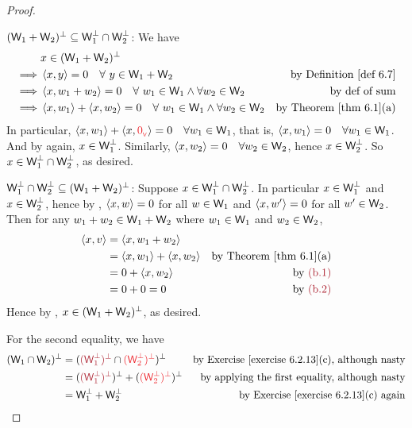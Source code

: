 \begin{proof} \ 

\((\textsf{W}_1 + \textsf{W}_2)^{\perp} \subseteq \textsf{W}_1^{\perp} \cap \textsf{W}_2^{\perp}\):
We have
\begin{align*}
    & x \in (\W_1 + \W_2)^{\perp} \\
    \implies & \LG x, y \RG = 0 \quad \forall\ y \in \W_1 + \W_2 & \text{by \DEF{6.7}} \\
    \implies & \LG x, w_1 + w_2 \RG = 0 \quad \forall\ w_1 \in \W_1 \land \forall w_2 \in \W_2 & \text{by def of sum} \\
    \implies & \LG x, w_1 \RG + \LG x, w_2 \RG = 0 \quad \forall\ w_1 \in \W_1 \land \forall w_2 \in \W_2 & \text{by \THM{6.1}(a)}
\end{align*}
In particular, \(\LG x, w_1 \RG + \LG x, \RED{\OV} \RG = 0 \quad \forall w_1 \in \W_1\), that is, \(\left< x, w_1 \right> = 0 \quad \forall w_1 \in \textsf{W}_1\).
And by  again, \(x \in \textsf{W}_1^{\perp}\).
Similarly, \(\left< x, w_2 \right> = 0 \quad \forall w_2 \in \textsf{W}_2\), hence \(x \in \textsf{W}_2^{\perp}\).
So \(x \in \textsf{W}_1^{\perp} \cap \textsf{W}_2^{\perp}\), as desired.

\(\textsf{W}_1^{\perp} \cap \textsf{W}_2^{\perp} \subseteq (\textsf{W}_1 + \textsf{W}_2)^{\perp}\):
Suppose \(x \in \textsf{W}_1^{\perp} \cap \textsf{W}_2^{\perp}\).
In particular \(x \in \textsf{W}_1^{\perp}\) and \(x \in \textsf{W}_2^{\perp}\), hence by , \(\left< x, w \right> = 0\) for all \(w \in \textsf{W}_1\)  and \(\left< x, w' \right> = 0\) for all \(w' \in \textsf{W}_2\). 
Then for any \(w_1 + w_2 \in \textsf{W}_1 + \textsf{W}_2\) where \(w_1 \in \textsf{W}_1\) and \(w_2 \in \textsf{W}_2\),
\begin{align*}
    \LG x, v \RG & = \LG x, w_1 + w_2 \RG \\
        & = \LG x, w_1 \RG + \LG x, w_2 \RG & \text{by \THM{6.1}(a)} \\
        & = 0 + \LG x, w_2 \RG & \text{by \MAROON{(b.1)}} \\
        & = 0 + 0 = 0 & \text{by \MAROON{(b.2)}}
\end{align*}
Hence by , \(x \in (\textsf{W}_1 + \textsf{W}_2)^{\perp}\), as desired.

For the second equality, we have
\begin{align*}
    (\W_1 \cap \W_2)^{\perp} & = (\MAROON{(\W_1^{\perp})^{\perp}} \cap \RED{(\W_2^{\perp})^{\perp}})^{\perp} & \text{by \EXEC{6.2.13}(c), although nasty} \\
    & = (\MAROON{(\W_1^{\perp})^{\perp}})^{\perp} + (\RED{(\W_2^{\perp})^{\perp}})^{\perp} & \text{by applying the first equality, although nasty} \\
    & = \W_1^{\perp} + \W_2^{\perp} & \text{by \EXEC{6.2.13}(c) again}
\end{align*}
\end{proof}

